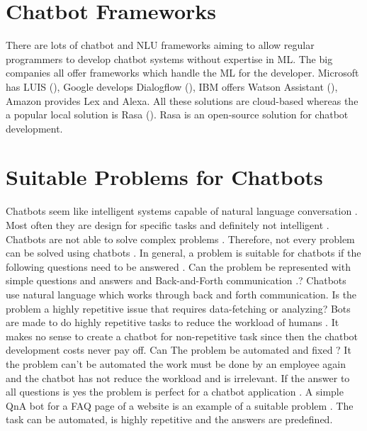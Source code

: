 \section{Chatbot Frameworks}
There are lots of chatbot and NLU frameworks aiming to allow regular programmers to 
develop chatbot systems without expertise in ML.
The big companies all offer frameworks which handle the ML for the developer.
Microsoft has LUIS (\citet{luis2015williams, luisdocs}),
Google develops Dialogflow (\citet{dialogflow}),
IBM offers Watson Assistant (\citet{watsonassistant}),
Amazon provides Lex and Alexa.
All these solutions are cloud-based whereas the a popular local solution is Rasa (\citet{rasabocklisch2017,rasa}). 
Rasa is an open-source solution for chatbot development.

\section{Suitable Problems for Chatbots} 
Chatbots seem like intelligent systems capable of natural language conversation \cite{buiildChatbotsPython}.
Most often they are design for specific tasks and definitely not intelligent \cite{buiildChatbotsPython}.
Chatbots are not able to solve complex problems \cite{buiildChatbotsPython}.
Therefore, not every problem can be solved using chatbots \cite{buiildChatbotsPython}.
In general, a problem is suitable for chatbots if the following questions need to be answered \cite{buiildChatbotsPython}.
Can the problem be represented with simple questions and answers and Back-and-Forth communication \cite{buiildChatbotsPython}.?
Chatbots use natural language which works through back and forth communication.
Is the problem a highly repetitive issue that requires data-fetching or analyzing? 
Bots are made to do highly repetitive tasks to reduce the workload of humans \cite{buiildChatbotsPython}.
It makes no sense to create a chatbot for non-repetitive task since then the chatbot development costs never pay off. 
Can The problem be automated and fixed \cite{buiildChatbotsPython}?
It the problem can't be automated the work must be done by an employee again and the chatbot has not reduce the workload and is irrelevant.
If the answer to all questions is yes the problem is perfect for a chatbot application \cite{buiildChatbotsPython}.
A simple QnA bot for a FAQ page of a website is an example of a suitable problem \cite{buiildChatbotsPython}.
The task can be automated, is highly repetitive and the answers are predefined.






